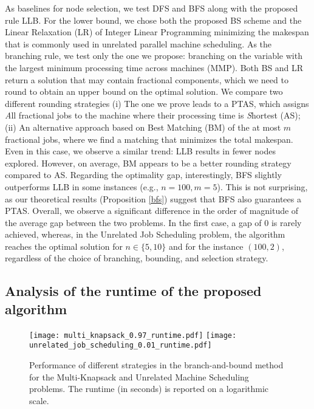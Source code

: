\documentclass[a4paper,UKenglish,cleveref, autoref, thm-restate, pdfa]{lipics-v2021}
\theoremstyle{plain}
\begin{document}
As baselines for node selection, we test DFS and BFS along with the proposed rule LLB.
For the lower bound, we chose both the proposed BS scheme and the Linear Relaxation (LR) of Integer Linear Programming minimizing the makespan that is commonly used in unrelated parallel machine scheduling.  
As the branching rule, we test only the one we propose: branching on the variable with the largest minimum processing time across machines (MMP).  
Both BS and LR return a solution that may contain fractional components, which we need to round to obtain an upper bound on the optimal solution.  
We compare two different rounding strategies (i) The one we prove leads to a PTAS, which assigns \emph{A}ll fractional jobs to the machine where their processing time is \emph{S}hortest (AS); (ii) An alternative approach based on Best Matching (BM) of the at most $m$ fractional jobs, where we find a matching that minimizes the total makespan. 
Even in this case, we observe a similar trend: LLB results in fewer nodes explored. However, on average, BM appears to be a better rounding strategy compared to AS.  
Regarding the optimality gap, interestingly, BFS slightly outperforms LLB in some instances (e.g., $n = 100, m = 5$). This is not surprising, as our theoretical results (Proposition \ref{bfs}) suggest that BFS also guarantees a PTAS.
Overall, we observe a significant difference in the order of magnitude of the average gap between the two problems. In the first case, a gap of 0 is rarely achieved, whereas, in the Unrelated Job Scheduling problem, the algorithm reaches the optimal solution for $n \in \{5, 10\}$ and for the instance $(100, 2)$, regardless of the choice of branching, bounding, and selection strategy.
 
\subsection{Analysis of the runtime of the proposed 
algorithm}\label{app:comp_exp}

\begin{figure}
    \centering
    \texttt{[image: multi\_knapsack\_0.97\_runtime.pdf]}
    \texttt{[image: unrelated\_job\_scheduling\_0.01\_runtime.pdf]}
    \caption{Performance of different strategies in the branch-and-bound method for the Multi-Knapsack and Unrelated Machine Scheduling problems. The runtime (in seconds) is reported on a logarithmic scale.}
    \label{fig:runtime}
\end{figure}
\end{document}
